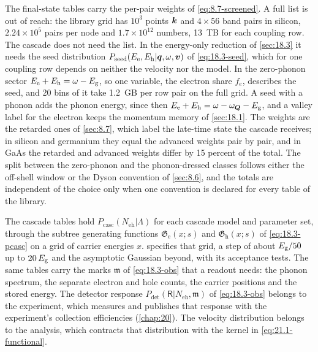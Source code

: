 The final-state tables carry the per-pair weights of \cref{eq:8.7-screened}. A full list is out of reach: the library grid has $10^3$ points $\bm{k}$ and $4\times56$ band pairs in silicon, $2.24\times10^5$ pairs per node and $1.7\times10^{12}$ numbers, \SI{13}{TB} for each coupling row. The cascade does not need the list. In the energy-only reduction of \cref{sec:18.3} it needs the seed distribution $P_{\mathrm{seed}}(E_{\mathrm{e}},E_{\mathrm{h}}|\bm{q},\omega,\bm{v})$ of \cref{eq:18.3-seed}, which for one coupling row depends on neither the velocity nor the model. In the zero-phonon sector $E_{\mathrm{e}} + E_{\mathrm{h}} = \omega - E_{\mathrm{g}}$, so one variable, the electron share $f_e$, describes the seed, and 20 bins of it take \SI{1.2}{GB} per row pair on the full grid. A seed with a phonon adds the phonon energy, since then $E_{\mathrm{e}} + E_{\mathrm{h}} = \omega - \omega_{\bm{Q}} - E_{\mathrm{g}}$, and a valley label for the electron keeps the momentum memory of \cref{sec:18.1}. The weights are the retarded ones of \cref{sec:8.7}, which label the late-time state the cascade receives; in silicon and germanium they equal the advanced weights pair by pair, and in GaAs the retarded and advanced weights differ by 15 percent of the total. The split between the zero-phonon and the phonon-dressed classes follows either the off-shell window or the Dyson convention of \cref{sec:8.6}, and the totals are independent of the choice only when one convention is declared for every table of the library.

The cascade tables hold $P_{\mathrm{casc}}(N_{\mathrm{eh}}|\Lambda)$ for each cascade model and parameter set, through the subtree generating functions $\mathfrak{G}_{\mathrm{e}}(x;s)$ and $\mathfrak{G}_{\mathrm{h}}(x;s)$ of \cref{eq:18.3-pcasc} on a grid of carrier energies $x$.  specifies that grid, a step of about $E_{\mathrm{g}}/50$ up to $20\,E_{\mathrm{g}}$ and the asymptotic Gaussian beyond, with its acceptance tests. The same tables carry the marks $\mathfrak{m}$ of \cref{eq:18.3-obs} that a readout needs: the phonon spectrum, the separate electron and hole counts, the carrier positions and the stored energy. The detector response $P_{\mathrm{det}}(\mathsf{R}|N_{\mathrm{eh}},\mathfrak{m})$ of \cref{eq:18.3-obs} belongs to the experiment, which measures and publishes that response with the experiment's collection efficiencies (\cref{chap:20}). The velocity distribution belongs to the analysis, which contracts that distribution with the kernel in \cref{eq:21.1-functional}.

